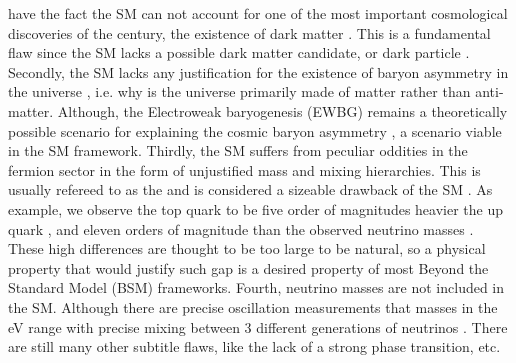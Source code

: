  have the fact  the SM can not account for one of the most important cosmological discoveries of the century, the existence of dark matter . This is a fundamental flaw since the SM lacks a possible dark matter candidate, or dark particle . 
%
Secondly, the SM lacks any justification for the existence of baryon asymmetry in the universe , i.e. why is the universe primarily made of matter rather than anti-matter. 
%
Although,  the Electroweak baryogenesis (EWBG) remains a theoretically possible scenario for explaining the cosmic baryon asymmetry , a scenario viable in the SM framework.
%
Thirdly, the SM suffers from peculiar oddities in the fermion sector in the form of unjustified mass and mixing hierarchies. This is usually refereed to as the  and is considered a sizeable drawback of the SM .  
%
As  example, we observe the top quark to be five order of magnitudes heavier  the up quark , and eleven orders of magnitude than the observed neutrino masses . These high differences are thought to be too large to be natural, so a physical property that would justify such gap is a desired property of most Beyond the Standard Model (BSM) frameworks. 
%
Fourth,  neutrino masses are not included in the SM. Although there are precise oscillation measurements  that  masses in the eV range with precise mixing  between 3 different generations of neutrinos . 
%
There are still many other subtitle flaws, like the lack of a strong phase transition,  etc.   

